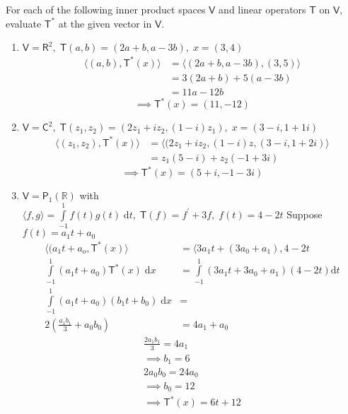For each of the following inner product spaces $\mathsf{V}$ and linear
operators $\mathsf{T}$ on $\mathsf{V},$ evaluate $\mathsf{T}^*$ at the
given vector in $\mathsf{V}.$
\begin{enumerate}
\item $\mathsf{V} = \mathsf{R}^2, \; \mathsf{T}(a,b) = (2a+b,a-3b),\;
  x= (3,4)$
\begin{align}
\langle (a,b),\mathsf{T}^*(x) \rangle &= \langle
(2a+b,a-3b),(3,5)\rangle\\
&= 3(2a+b) + 5(a-3b)\\
&= 11a-12b
\end{align}
\begin{equation}
\implies \mathsf{T}^*(x) = (11,-12)
\end{equation}
\item $\mathsf{V} = \mathsf{C}^2,\; \mathsf{T}(z_1,z_2) =
  (2z_1+iz_2,(1-i)z_1),\; x =(3-i,1+1i)$ 
\begin{align}
\langle (z_1,z_2), \mathsf{T}^*(x) \rangle &= \langle
(2z_1+iz_2,(1-i)z,(3-i,1+2i)\rangle\\
&=z_1(5-i) + z_2(-1+3i)
\end{align}
\begin{equation}
\implies \mathsf{T}^*(x) = (5+i,-1-3i)
\end{equation}
\item $\mathsf{V} = \mathsf{P}_1(\mathbb{R})$ with $\langle f,g\rangle
  = \int\limits_{-1}^1 f(t)g(t) \; \mathrm{d}t,\; \mathsf{T}(f) =
  f^\prime + 3f,\; f(t) = 4-2t$
Suppose $f(t) = a_1t + a_0$
\begin{align}
\langle(a_1t+a_o,\mathsf{T}^*(x)\rangle &= \langle
3a_1t+(3a_0+a_1),4-2t\\
\int\limits_{-1}^1 (a_1t + a_0)\mathsf{T}^*(x) \; \mathrm{d}x &=
\int\limits^1_{-1} (3a_1t+3a_0+a_1)(4-2t) \mathrm{d}t\\
\int\limits_{-1}^1 (a_1t + a_0)(b_1t+ b_0) \; \mathrm{d}x &=\\
2\left(\frac{a_1b_1}{3} + a_0b_0\right) &= 4a_1 + a_0
\end{align}
\begin{gather}
\frac{2a_1b_1}{3} = 4a_1\\
\implies b_1 = 6\\
2a_0b_0 = 24a_0 \\
\implies b_0 = 12\\
\implies \mathsf{T}^*(x) = 6t+12
\end{gather}
\end{enumerate}
